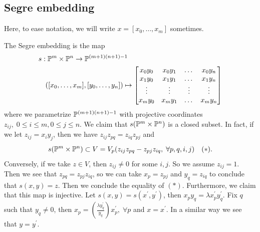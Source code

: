 \subsection{Segre embedding}
\begin{remark}
    Here, to ease notation, we will write $x=[x_0,\dots, x_m]$ sometimes.
\end{remark}
The Segre embedding is the map 
\begin{equation}
    \begin{split}
          &s:\mathbb{P}^{m}\times\mathbb{P}^n\rightarrow \mathbb{P}^{(m+1)(n+1)-1}\\
          &\quad([x_0,\dots,x_m],[y_0,\dots, y_n])\mapsto 
          \left[\begin{matrix}
            x_0y_0&x_0y_1&\dots&x_0y_n\\
            x_1y_0&x_1y_1&\dots&x_1y_n\\
            \vdots&\vdots&\vdots&\vdots\\
            x_my_0&x_my_1&\dots&x_my_n
          \end{matrix}\right]
    \end{split}
\end{equation}
where we parametrize $\mathbb{P}^{(m+1)(n+1)-1}$ with projective coordinates $z_{ij},\;0\leq i\leq m,0\leq j\leq n$.
We claim that $s(\mathbb{P}^m\times\mathbb{P}^n)$ is a closed subset. In fact, if we let 
$z_{ij}=x_iy_j$, then we have $z_{ij}z_{pq}=z_{iq}z_{pj}$ and 
\begin{equation}
    s(\mathbb{P}^m\times\mathbb{P}^n)\subset V=V_p(z_{ij}z_{pq}-z_{pj}z_{iq},\;\forall p,q,i,j)\quad(*).
\end{equation}
Conversely, if we take $z\in V$, then $z_{ij}\neq0$ for some $i,j$. So we assume $z_{ij}=1$. Then we see that 
$z_{pq} = z_{pj}z_{iq}$, so we can take $x_p  = z_{pj}$ and $y_q=z_{iq}$ to conclude that 
$s(x,y)=z$. Then we conclude the equality of $(*)$. Furthermore, we claim that this map is injective. Let 
$s(x,y)=s(x^\prime,y^\prime)$, then $x_py_q=\lambda x_p^\prime y_q^\prime$. Fix $q$ such that $y_q\neq0$, then 
$x_p = (\frac{\lambda y_q^\prime}{y_q})x_p^\prime,\;\forall p$ and $x=x^\prime$. In a similar way we see that $y=y^\prime$.\par 

